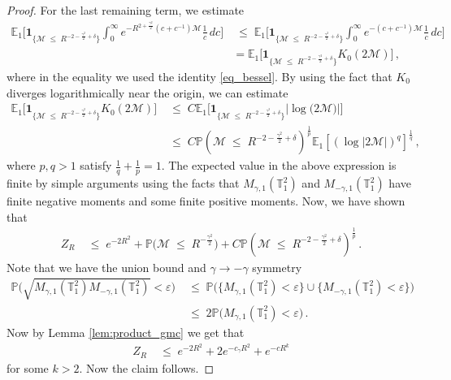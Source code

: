 \documentclass[11pt]{article}
\numberwithin{equation}{section}
\theoremstyle{definition}
\renewcommand{\leq}{\;\leqslant\;}                   %
\newcommand{\E}{\mathbb{E}}
\renewcommand{\P}{\mathbb{P}}
\def\eps{\varepsilon}
\def\T{\mathbb{T}}
\newcommand{\ab}{|}
\newcommand{\grea}{>}
\newcommand{\Pb}{\P}
\newcommand{\tor}{{\T_1^2}}
\begin{document}
\begin{proof}
For the last remaining term, we estimate
\begin{align*}
\E_1 \Big[ \mathbf{1}_{ \{  \mathcal{M} \leq  R^{-2 - \frac{\gamma^2}{2} + \delta }  \} } \int_0^\infty e^{- R^{2 + \frac{\gamma^2}{2}}  (c+c^{-1}) \mathcal{M} } \tfrac{1}{c} \, dc \Big] & \leq \E_1 \Big[ \mathbf{1}_{ \{  \mathcal{M} \leq R^{-2 - \frac{\gamma^2}{2} + \delta }  \} } \int_0^\infty e^{-    (c+c^{-1}) \mathcal{M} } \tfrac{1}{c} \, dc \Big] \\
&=  \E_1 \Big[ \mathbf{1}_{ \{   \mathcal{M} \leq R^{-2 - \frac{\gamma^2}{2}+ \delta}  \} } K_0 ( 2 \mathcal{M} ) \Big]\,,
\end{align*}
where in the equality we used the identity \eqref{eq_bessel}. By using the fact that $K_0$ diverges logarithmically near the origin, we can estimate 
\begin{align*}
\E_1 \Big[ \mathbf{1}_{ \{   \mathcal{M} \leq  R^{-2 - \frac{\gamma^2}{2}+ \delta}  \} } K_0 ( 2  \mathcal{M} ) \Big] & \leq C \E_1 \Big[ \mathbf{1}_{   \{  \mathcal{M} \leq R^{-2 - \frac{\gamma^2}{2}+ \delta} \} }  \ab \log \big( 2  \mathcal{M} \big) \ab  \Big] \\
&\leq  C \P (  \mathcal{M} \leq R^{-2 - \frac{\gamma^2}{2}+ \delta} )^{\frac{1}{p}} \E_1 [(\log \ab 2 \mathcal{M} \ab )^q]^{\frac{1}{q}}\,,
\end{align*}
where $p,q \grea 1$ satisfy $\frac{1}{q} + \frac{1}{p} = 1$. The expected value in the above expression is finite by simple arguments using the facts that $M_{\gamma,1}(\tor)$ and $M_{-\gamma,1}(\tor)$ have finite negative moments and some finite positive moments. Now, we have shown that
\begin{align}\label{Z_ub}
Z_R & \leq  e^{-2  R^2}   + \P \big(  \mathcal{M} \leq  R^{- \frac{\gamma^2}{2}} \big)    + C \P ( \mathcal{M} \leq  R^{-2 - \frac{\gamma^2}{2}+ \delta} )^{\frac{1}{p}}\,.
\end{align}
Note that we have the union bound and $\gamma \to -\gamma$ symmetry
\begin{align}\label{eq_union_bound}
\Pb \big(\sqrt{M_{\gamma,1}(\tor) M_{-\gamma,1}(\tor)} \less \eps \big) & \leq \Pb \big( \{ M_{\gamma,1}(\tor) \less \eps \} \cup \{ M_{-\gamma,1}(\tor) \less \eps \} \big) \nonumber \\
& \leq 2 \Pb \big( M_{\gamma,1}(\tor) \less \eps \big)\,.
\end{align}
Now by Lemma \ref{lem:product_gmc} we get that 
\begin{align}\label{Z_ub2}
Z_R & \leq e^{-2R^2} + 2 e^{-c_\gamma R^2} + e^{-c R^k}
\end{align}
for some $k>2$. Now the claim follows.

\end{proof}
\end{document}
